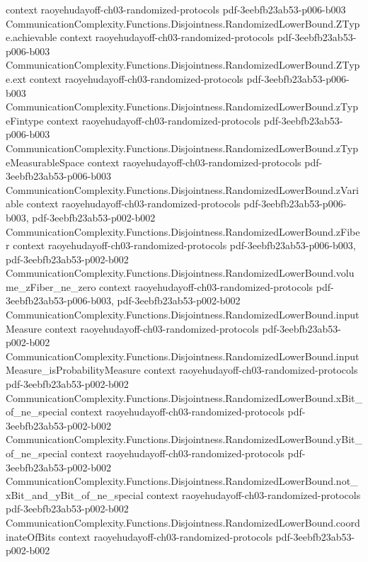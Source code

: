 \begin{theorem}
  {context}
  {raoyehudayoff-ch03-randomized-protocols}
  {pdf-3eebfb23ab53-p006-b003}
\proofstep
  {CommunicationComplexity.Functions.Disjointness.RandomizedLowerBound.ZType.achievable}
  {context}
  {raoyehudayoff-ch03-randomized-protocols}
  {pdf-3eebfb23ab53-p006-b003}
\proofstep
  {CommunicationComplexity.Functions.Disjointness.RandomizedLowerBound.ZType.ext}
  {context}
  {raoyehudayoff-ch03-randomized-protocols}
  {pdf-3eebfb23ab53-p006-b003}
\proofstep
  {CommunicationComplexity.Functions.Disjointness.RandomizedLowerBound.zTypeFintype}
  {context}
  {raoyehudayoff-ch03-randomized-protocols}
  {pdf-3eebfb23ab53-p006-b003}
\proofstep
  {CommunicationComplexity.Functions.Disjointness.RandomizedLowerBound.zTypeMeasurableSpace}
  {context}
  {raoyehudayoff-ch03-randomized-protocols}
  {pdf-3eebfb23ab53-p006-b003}
\proofstep
  {CommunicationComplexity.Functions.Disjointness.RandomizedLowerBound.zVariable}
  {context}
  {raoyehudayoff-ch03-randomized-protocols}
  {pdf-3eebfb23ab53-p006-b003,
    pdf-3eebfb23ab53-p002-b002}
\proofstep
  {CommunicationComplexity.Functions.Disjointness.RandomizedLowerBound.zFiber}
  {context}
  {raoyehudayoff-ch03-randomized-protocols}
  {pdf-3eebfb23ab53-p006-b003,
    pdf-3eebfb23ab53-p002-b002}
\proofstep
  {CommunicationComplexity.Functions.Disjointness.RandomizedLowerBound.volume_zFiber_ne_zero}
  {context}
  {raoyehudayoff-ch03-randomized-protocols}
  {pdf-3eebfb23ab53-p006-b003,
    pdf-3eebfb23ab53-p002-b002}
\proofstep
  {CommunicationComplexity.Functions.Disjointness.RandomizedLowerBound.inputMeasure}
  {context}
  {raoyehudayoff-ch03-randomized-protocols}
  {pdf-3eebfb23ab53-p002-b002}
\proofstep
  {CommunicationComplexity.Functions.Disjointness.RandomizedLowerBound.inputMeasure_isProbabilityMeasure}
  {context}
  {raoyehudayoff-ch03-randomized-protocols}
  {pdf-3eebfb23ab53-p002-b002}
\proofstep
  {CommunicationComplexity.Functions.Disjointness.RandomizedLowerBound.xBit_of_ne_special}
  {context}
  {raoyehudayoff-ch03-randomized-protocols}
  {pdf-3eebfb23ab53-p002-b002}
\proofstep
  {CommunicationComplexity.Functions.Disjointness.RandomizedLowerBound.yBit_of_ne_special}
  {context}
  {raoyehudayoff-ch03-randomized-protocols}
  {pdf-3eebfb23ab53-p002-b002}
\proofstep
  {CommunicationComplexity.Functions.Disjointness.RandomizedLowerBound.not_xBit_and_yBit_of_ne_special}
  {context}
  {raoyehudayoff-ch03-randomized-protocols}
  {pdf-3eebfb23ab53-p002-b002}
\proofstep
  {CommunicationComplexity.Functions.Disjointness.RandomizedLowerBound.coordinateOfBits}
  {context}
  {raoyehudayoff-ch03-randomized-protocols}
  {pdf-3eebfb23ab53-p002-b002}

\end{theorem}
